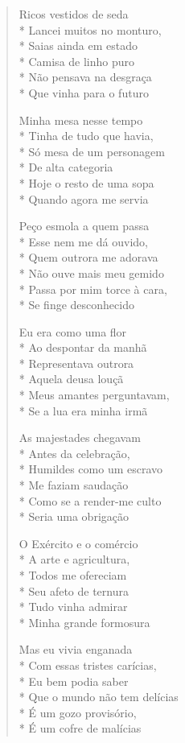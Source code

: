 \begin{verse}
Ricos vestidos de seda\\*
Lancei muitos no monturo,\\*
Saias ainda em estado\\*
Camisa de linho puro\\*
Não pensava na desgraça\\*
Que vinha para o futuro

Minha mesa nesse tempo\\*
Tinha de tudo que havia,\\*
Só mesa de um personagem\\*
De alta categoria\\*
Hoje o resto de uma sopa\\*
Quando agora me servia

Peço esmola a quem passa\\*
Esse nem me dá ouvido,\\*
Quem outrora me adorava\\*
Não ouve mais meu gemido\\*
Passa por mim torce à cara,\\*
Se finge desconhecido

Eu era como uma flor\\*
Ao despontar da manhã\\*
Representava outrora\\*
Aquela deusa louçã\\*
Meus amantes perguntavam,\\*
Se a lua era minha irmã

As majestades chegavam\\*
Antes da celebração,\\*
Humildes como um escravo\\*
Me faziam saudação\\*
Como se a render-me culto\\*
Seria uma obrigação

O Exército e o comércio\\*
A arte e agricultura,\\*
Todos me ofereciam\\*
Seu afeto de ternura\\*
Tudo vinha admirar\\*
Minha grande formosura

Mas eu vivia enganada\\*
Com essas tristes carícias,\\*
Eu bem podia saber\\*
Que o mundo não tem delícias\\*
É um gozo provisório,\\*
É um cofre de malícias


\end{verse}
